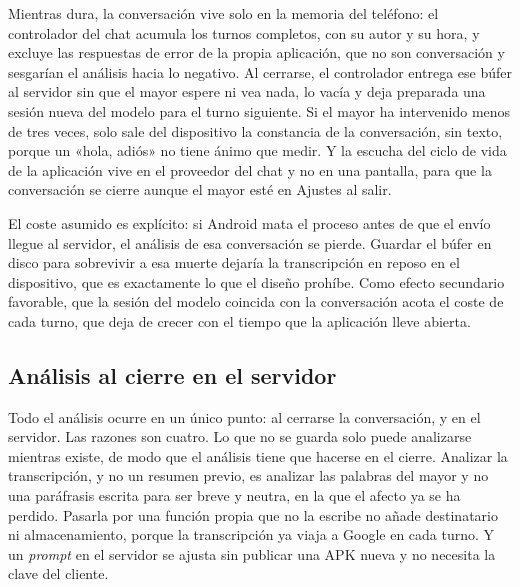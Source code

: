 Mientras dura, la conversación vive solo en la memoria del teléfono: el controlador del chat acumula los
turnos completos, con su autor y su hora, y excluye las respuestas de error de la propia aplicación, que no
son conversación y sesgarían el análisis hacia lo negativo. Al cerrarse, el controlador entrega ese búfer al
servidor sin que el mayor espere ni vea nada, lo vacía y deja preparada una sesión nueva del modelo para el
turno siguiente. Si el mayor ha intervenido menos de tres veces, solo sale del dispositivo la constancia de
la conversación, sin texto, porque un «hola, adiós» no tiene ánimo que medir. Y la escucha del ciclo de vida
de la aplicación vive en el proveedor del chat y no en una pantalla, para que la conversación se cierre
aunque el mayor esté en Ajustes al salir.

El coste asumido es explícito: si Android mata el proceso antes de que el envío llegue al servidor, el
análisis de esa conversación se pierde. Guardar el búfer en disco para sobrevivir a esa muerte dejaría la
transcripción en reposo en el dispositivo, que es exactamente lo que el diseño prohíbe. Como efecto
secundario favorable, que la sesión del modelo coincida con la conversación acota el coste de cada turno,
que deja de crecer con el tiempo que la aplicación lleve abierta.

\subsection{Análisis al cierre en el servidor}

Todo el análisis ocurre en un único punto: al cerrarse la conversación, y en el servidor. Las razones son
cuatro. Lo que no se guarda solo puede analizarse mientras existe, de modo que el análisis tiene que hacerse
en el cierre. Analizar la transcripción, y no un resumen previo, es analizar las palabras del mayor y no una
paráfrasis escrita para ser breve y neutra, en la que el afecto ya se ha perdido. Pasarla por una función
propia que no la escribe no añade destinatario ni almacenamiento, porque la transcripción ya viaja a Google
en cada turno. Y un \emph{prompt} en el servidor se ajusta sin publicar una APK nueva y no necesita la clave
del cliente.

